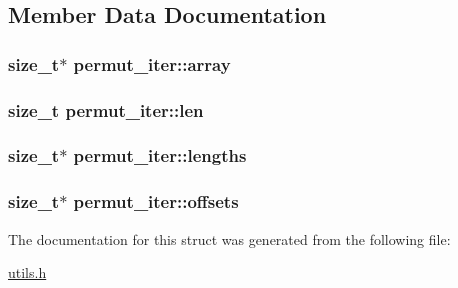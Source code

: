 \subsection{\-Member \-Data \-Documentation}
\hypertarget{structpermut__iter_a0f17d538587268e87ee958bb52b81e81}{
\subsubsection[{array}]{\setlength{\rightskip}{0pt plus 5cm}size\-\_\-t$\ast$ {\bf permut\-\_\-iter\-::array}}}\label{structpermut__iter_a0f17d538587268e87ee958bb52b81e81}
\hypertarget{structpermut__iter_a33e74b5a166138a63700b6b5916c36cb}{
\subsubsection[{len}]{\setlength{\rightskip}{0pt plus 5cm}size\-\_\-t {\bf permut\-\_\-iter\-::len}}}\label{structpermut__iter_a33e74b5a166138a63700b6b5916c36cb}
\hypertarget{structpermut__iter_ad2f6ea38d8e42e8c48a747cf06032032}{
\subsubsection[{lengths}]{\setlength{\rightskip}{0pt plus 5cm}size\-\_\-t$\ast$ {\bf permut\-\_\-iter\-::lengths}}}\label{structpermut__iter_ad2f6ea38d8e42e8c48a747cf06032032}
\hypertarget{structpermut__iter_aa3c8cdc4be5fba6e7d7b36f748710706}{
\subsubsection[{offsets}]{\setlength{\rightskip}{0pt plus 5cm}size\-\_\-t$\ast$ {\bf permut\-\_\-iter\-::offsets}}}\label{structpermut__iter_aa3c8cdc4be5fba6e7d7b36f748710706}


\-The documentation for this struct was generated from the following file\-:\begin{DoxyCompactItemize}
\item 
\hyperlink{utils_8h}{utils.\-h}\end{DoxyCompactItemize}
